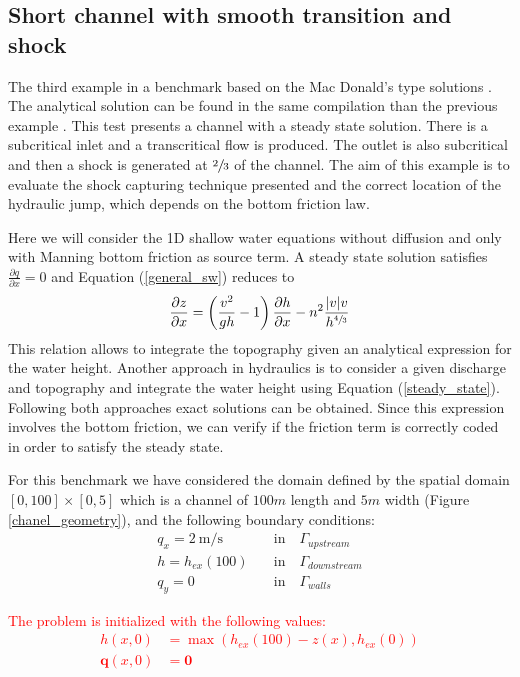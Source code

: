 \documentclass[a4paper,12pt]{elsarticle}
\newcommand{\Miguel}[1]{\textcolor{red}{#1}}
\newcommand{\pder}[2]{\frac{\partial#1}{\partial#2}}
\newcommand{\abs}[1]{\lvert#1\rvert}
\begin{document}
\subsection{Short channel with smooth transition and shock}

The third example in a benchmark based on the Mac Donald's type solutions \cite{macdonald1997}. The analytical solution can be found in the same compilation than the previous example \cite{delestre2013}. This test presents a channel with a steady state solution. There is a subcritical inlet and a transcritical flow is produced. The outlet is also subcritical and then a shock is generated at $\sfrac{2}{3}$ of the channel. The aim of this example is to evaluate the shock capturing technique presented and the correct location of the hydraulic jump, which depends on the bottom friction law.

Here we will consider the 1D shallow water equations without diffusion and only with Manning bottom friction as source term. A steady state solution satisfies $\pder{q}{x}=0$ and Equation (\ref{general_sw}) reduces to
\begin{equation} \label{steady_state}
\pder{z}{x} = \left(\frac{v^2}{gh}-1\right) \pder{h}{x} - n^2\frac{\abs{v}v}{h^{\sfrac{4}{3}}}
\end{equation}
This relation allows to integrate the topography given an analytical expression for the water height. Another approach in hydraulics is to consider a given discharge and topography and integrate the water height using Equation (\ref{steady_state}). Following both approaches exact solutions can be obtained. Since this expression involves the bottom friction, we can verify if the friction term is correctly coded in order to satisfy the steady state.

For this benchmark we have considered the domain defined by the spatial domain $[0,100]\times[0,5]$ which is a channel of $100m$ length and $5m$ width (Figure \ref{chanel_geometry}), and the following boundary conditions:
\begin{equation}
\begin{split}
    q_x = 2\ \text{m/s} \quad &\text{in} \quad \Gamma_{upstream} \\
    h = h_{ex}(100) \quad &\text{in} \quad \Gamma_{downstream} \\
    q_y = 0 \quad &\text{in} \quad \Gamma_{walls}
\end{split}
\end{equation}

\Miguel{
The problem is initialized with the following values:
\begin{equation}
\begin{split}
    h(x,0) &= \max(h_{ex}(100) - z(x), h_{ex}(0)) \\
    \mathbf{q}(x,0) &= \mathbf{0}
\end{split}
\end{equation}
}
\end{document}
